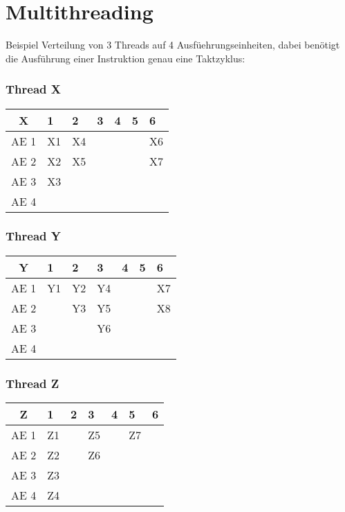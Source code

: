 \section{Multithreading}
Beispiel Verteilung von 3 Threads auf 4 Ausfüehrungseinheiten, dabei benötigt die Ausführung
einer Instruktion genau eine Taktzyklus:
\subsubsection*{Thread X}
\begin{tabular}{|c|llllll|}\hline
  X  & 1 & 2 & 3 & 4 & 5 & 6\\\hline
AE 1 & X1 & X4 &   &   &   & X6\\
AE 2 & X2 & X5 &   &   &   & X7\\
AE 3 & X3 &    &   &   &   &   \\
AE 4 &    &    &   &   &   &   \\\hline
\end{tabular}\par
\subsubsection*{Thread Y}
\begin{tabular}{|c|llllll|}\hline
  Y  & 1 & 2 & 3 & 4 & 5 & 6\\\hline
AE 1 & Y1 & Y2 & Y4 &   &   & X7\\
AE 2 &    & Y3 & Y5 &   &   & X8\\
AE 3 &    &    & Y6 &   &   &   \\
AE 4 &    &    &    &   &   &   \\\hline
\end{tabular}\par
\subsubsection*{Thread Z}
\begin{tabular}{|c|llllll|}\hline
  Z  & 1 & 2 & 3 & 4 & 5 & 6\\\hline
AE 1 & Z1 &   & Z5 &   & Z7 &  \\
AE 2 & Z2 &   & Z6 &   &    &  \\
AE 3 & Z3 &   &    &   &    &  \\
AE 4 & Z4 &   &    &   &    &  \\\hline
\end{tabular}\par

